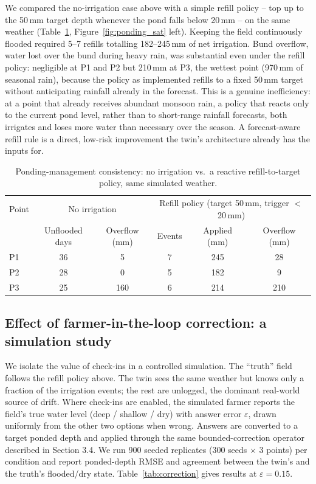 \documentclass[11pt,a4paper]{article}
\begin{document}
We compared the no-irrigation case above with a simple refill policy -- top up to the 50\,mm target depth whenever the pond falls below 20\,mm -- on the same weather (Table~\ref{tab:ponding}, Figure~\ref{fig:ponding_sat} left). Keeping the field continuously flooded required 5--7 refills totalling 182--245\,mm of net irrigation. Bund overflow, water lost over the bund during heavy rain, was substantial even under the refill policy: negligible at P1 and P2 but 210\,mm at P3, the wettest point (970\,mm of seasonal rain), because the policy as implemented refills to a fixed 50\,mm target without anticipating rainfall already in the forecast. This is a genuine inefficiency: at a point that already receives abundant monsoon rain, a policy that reacts only to the current pond level, rather than to short-range rainfall forecasts, both irrigates and loses more water than necessary over the season. A forecast-aware refill rule is a direct, low-risk improvement the twin's architecture already has the inputs for.

\begin{table}[htbp]
\centering
\caption{Ponding-management consistency: no irrigation vs.\ a reactive refill-to-target policy, same simulated weather.}
\label{tab:ponding}
\begin{tabular}{lccccc}
\toprule
Point & \multicolumn{2}{c}{No irrigation} & \multicolumn{3}{c}{Refill policy (target 50\,mm, trigger $<$20\,mm)} \\
 & Unflooded days & Overflow (mm) & Events & Applied (mm) & Overflow (mm) \\
\midrule
P1 & 36 & 5 & 7 & 245 & 28 \\
P2 & 28 & 0 & 5 & 182 & 9 \\
P3 & 25 & 160 & 6 & 214 & 210 \\
\bottomrule
\end{tabular}
\end{table}

\subsection{Effect of farmer-in-the-loop correction: a simulation study}

We isolate the value of check-ins in a controlled simulation. The ``truth'' field follows the refill policy above. The twin sees the same weather but knows only a fraction of the irrigation events; the rest are unlogged, the dominant real-world source of drift. Where check-ins are enabled, the simulated farmer reports the field's true water level (deep / shallow / dry) with answer error $\varepsilon$, drawn uniformly from the other two options when wrong. Answers are converted to a target ponded depth and applied through the same bounded-correction operator described in Section 3.4. We run 900 seeded replicates (300 seeds $\times$ 3 points) per condition and report ponded-depth RMSE and agreement between the twin's and the truth's flooded/dry state. Table~\ref{tab:correction} gives results at $\varepsilon=0.15$.
\end{document}
